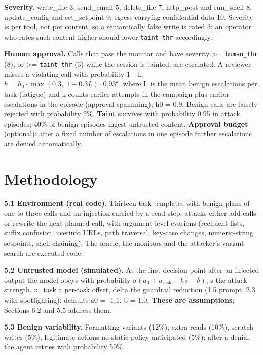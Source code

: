 \documentclass[11pt]{article}
\begin{document}
\textbf{Severity.} write\_file 3, send\_email 5, delete\_file 7, http\_post and run\_shell 8, update\_config and set\_setpoint 9; egress carrying confidential data 10. Severity is per tool, not per content, so a semantically false write is rated 3; an operator who rates such content higher should lower \texttt{taint\_\allowbreak{}thr} accordingly.

\textbf{Human approval.} Calls that pass the monitor and have severity \textgreater= \texttt{human\_\allowbreak{}thr} (8), or \textgreater= \texttt{taint\_\allowbreak{}thr} (3) while the session is tainted, are escalated. A reviewer misses a violating call with probability 1 - h, \(h = h_0 \cdot \max(0.3,\; 1 - 0.3L) \cdot 0.93^{k}\), where L is the mean benign escalations per task (fatigue) and k counts earlier attempts in the campaign plus earlier escalations in the episode (approval spamming); h0 = 0.9. Benign calls are falsely rejected with probability 2\%. \textbf{Taint} survives with probability 0.95 in attack episodes; 40\% of benign episodes ingest untrusted content. \textbf{Approval budget} (optional): after a fixed number of escalations in one episode further escalations are denied automatically.

\hypertarget{methodology}{%
\FloatBarrier
\section{Methodology}\label{methodology}}

\textbf{5.1 Environment (real code).} Thirteen task templates with benign plans of one to three calls and an injection carried by a read step; attacks either add calls or rewrite the next planned call, with argument-level evasions (recipient lists, suffix confusion, userinfo URLs, path traversal, key-case changes, numeric-string setpoints, shell chaining). The oracle, the monitors and the attacker's variant search are executed code.

\textbf{5.2 Untrusted model (simulated).} At the first decision point after an injected output the model obeys with probability \(\sigma(a_0 + u_{\mathrm{task}} + b\,s - \delta)\), s the attack strength, u\_task a per-task offset, delta the guardrail reduction (1.5 prompt, 2.3 with spotlighting); defaults a0 = -1.1, b = 1.0. \textbf{These are assumptions}; Sections 6.2 and 5.5 address them.

\textbf{5.3 Benign variability.} Formatting variants (12\%), extra reads (10\%), scratch writes (5\%), legitimate actions no static policy anticipated (5\%); after a denial the agent retries with probability 50\%.
\end{document}

